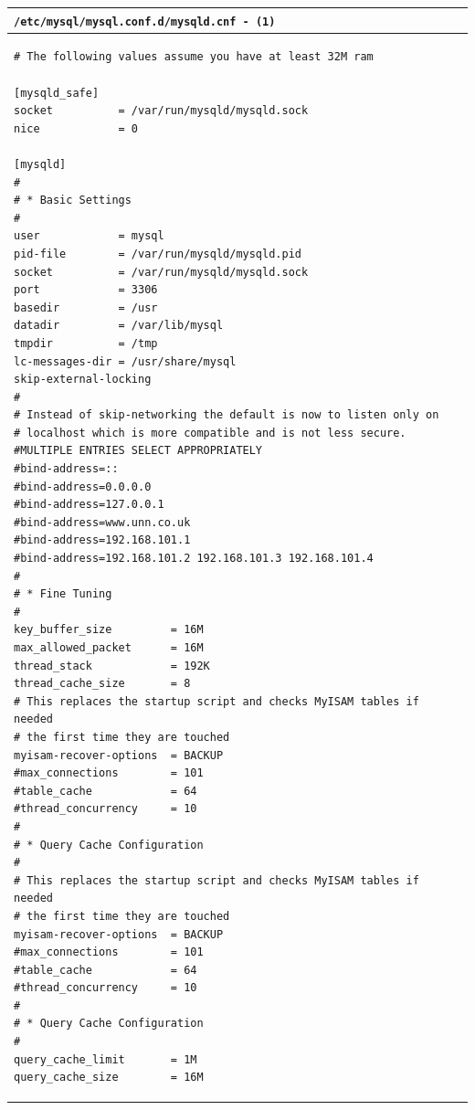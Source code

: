 \documentclass[11pt]{article}
\begin{document}
\begin{table}[ht]
    \begin{tabular}{|p{17.7cm}|} 
        \hline
    \texttt{\textbf{/etc/mysql/mysql.conf.d/mysqld.cnf} - (\texttt{1})}\\ 
        \hline
        \lstset{
                basicstyle=\scriptsize\ttfamily,
        }
            \begin{lstlisting}
# The following values assume you have at least 32M ram

[mysqld_safe]
socket          = /var/run/mysqld/mysqld.sock
nice            = 0

[mysqld]
#
# * Basic Settings
#
user            = mysql
pid-file        = /var/run/mysqld/mysqld.pid
socket          = /var/run/mysqld/mysqld.sock
port            = 3306
basedir         = /usr
datadir         = /var/lib/mysql
tmpdir          = /tmp
lc-messages-dir = /usr/share/mysql
skip-external-locking
#
# Instead of skip-networking the default is now to listen only on
# localhost which is more compatible and is not less secure.
#MULTIPLE ENTRIES SELECT APPROPRIATELY
#bind-address=::
#bind-address=0.0.0.0
#bind-address=127.0.0.1
#bind-address=www.unn.co.uk
#bind-address=192.168.101.1
#bind-address=192.168.101.2 192.168.101.3 192.168.101.4
#
# * Fine Tuning
#
key_buffer_size         = 16M
max_allowed_packet      = 16M
thread_stack            = 192K
thread_cache_size       = 8
# This replaces the startup script and checks MyISAM tables if needed
# the first time they are touched
myisam-recover-options  = BACKUP
#max_connections        = 101
#table_cache            = 64
#thread_concurrency     = 10
#
# * Query Cache Configuration
#
# This replaces the startup script and checks MyISAM tables if needed
# the first time they are touched
myisam-recover-options  = BACKUP
#max_connections        = 101
#table_cache            = 64
#thread_concurrency     = 10
#
# * Query Cache Configuration
#
query_cache_limit       = 1M
query_cache_size        = 16M
            \end{lstlisting}\\
        \hline
    \end{tabular}
\end{table}
\end{document}
